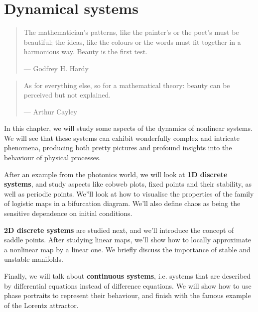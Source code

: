 \chapter{Dynamical systems}
\label{h:dynamical}

\begin{quote}
The mathematician's patterns, like the painter's or the poet's must be beautiful; the ideas, like the colours or the words must fit together in a harmonious way. Beauty is the first test.

--- Godfrey H. Hardy
\end{quote}

\begin{quote}
As for everything else, so for a mathematical theory: beauty can be perceived but not explained.

--- Arthur Cayley
\end{quote}

\chaptertoc

In this chapter, we will study some aspects of the dynamics of nonlinear systems. We will see that these systems can exhibit wonderfully complex and intricate phenomena, producing both pretty pictures and profound insights into the behaviour of physical processes.

After an example from the photonics world, we will look at \textbf{1D discrete systems}, and study aspects like cobweb plots, fixed points and their stability, as well as periodic points. We''ll look at how to visualise the properties of the family of logistic maps in a bifurcation diagram. We'll also define chaos as being the sensitive dependence on initial conditions.

\textbf{2D discrete systems} are studied next, and we'll introduce the concept of saddle points. After studying linear maps, we'll show how to locally approximate a nonlinear map by a linear one. We briefly discuss the importance of stable and unstable manifolds.

Finally, we will talk about \textbf{continuous systems}, i.e. systems that are described by differential equations instead of difference equations. We will show how to use phase portraits to represent their behaviour, and finish with the famous example of the Lorentz attractor.

\pagebreak


